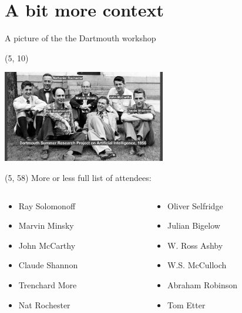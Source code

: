\section{A bit more context}

\begin{frame}{A picture of the the Dartmouth workshop}

  \begin{textblock}{90}(5, 10)
    \begin{center}
      \includegraphics[height=4cm]{img/dartmouth-conference.jpg}
    \end{center}
  \end{textblock}

  \begin{textblock}{95}(5, 58)
    More or less full list of attendees:
    \begin{footnotesize}
    \begin{columns}[T]
      \begin{column}{0.33\textwidth}
        \begin{itemize}
        \item Ray Solomonoff
        \item Marvin Minsky
        \item John McCarthy
        \item Claude Shannon
        \item Trenchard More
        \item Nat Rochester
        \end{itemize}
      \end{column}

      \begin{column}{0.33\textwidth}
        \begin{itemize}
        \item Oliver Selfridge
        \item Julian Bigelow
        \item W. Ross Ashby
        \item W.S. McCulloch
        \item Abraham Robinson
        \item Tom Etter
        \end{itemize}
      \end{column}


\end{columns}
\end{footnotesize}
\end{textblock}
\end{frame}
